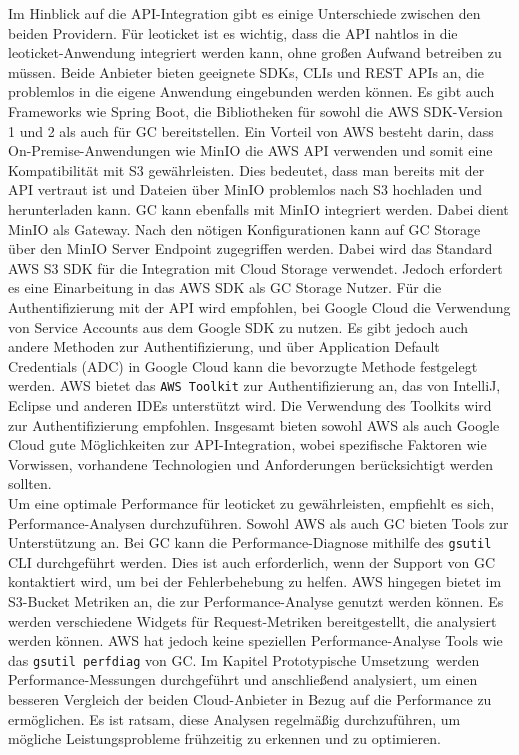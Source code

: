 Im Hinblick auf die API-Integration gibt es einige Unterschiede zwischen den beiden Providern. Für leoticket ist es wichtig, dass die API nahtlos in die leoticket-Anwendung integriert werden kann, ohne großen Aufwand betreiben zu müssen. Beide Anbieter bieten geeignete SDKs, CLIs und REST APIs an, die problemlos in die eigene Anwendung eingebunden werden können. Es gibt auch Frameworks wie Spring Boot, die Bibliotheken für sowohl die AWS SDK-Version 1 und 2 als auch für GC bereitstellen. Ein Vorteil von AWS besteht darin, dass On-Premise-Anwendungen wie MinIO die AWS API verwenden und somit eine Kompatibilität mit S3 gewährleisten. Dies bedeutet, dass man bereits mit der API vertraut ist und Dateien über MinIO problemlos nach S3 hochladen und herunterladen kann. GC kann ebenfalls mit MinIO integriert werden. Dabei dient MinIO als Gateway. Nach den nötigen Konfigurationen kann auf GC Storage über den MinIO Server Endpoint zugegriffen werden. Dabei wird das Standard AWS S3 SDK für die Integration mit Cloud Storage verwendet. Jedoch erfordert es eine Einarbeitung in das AWS SDK als GC Storage Nutzer. Für die Authentifizierung mit der API wird empfohlen, bei Google Cloud die Verwendung von Service Accounts aus dem Google SDK zu nutzen. Es gibt jedoch auch andere Methoden zur Authentifizierung, und über Application Default Credentials (ADC) in Google Cloud kann die bevorzugte Methode festgelegt werden. AWS bietet das \verb|AWS Toolkit| zur Authentifizierung an, das von IntelliJ, Eclipse und anderen IDEs unterstützt wird. Die Verwendung des Toolkits wird zur Authentifizierung empfohlen. Insgesamt bieten sowohl AWS als auch Google Cloud gute Möglichkeiten zur API-Integration, wobei spezifische Faktoren wie Vorwissen, vorhandene Technologien und Anforderungen berücksichtigt werden sollten.\\

Um eine optimale Performance für leoticket zu gewährleisten, empfiehlt es sich, Performance-Analysen durchzuführen. Sowohl AWS als auch GC bieten Tools zur Unterstützung an. Bei GC kann die Performance-Diagnose mithilfe des \verb|gsutil| CLI durchgeführt werden. Dies ist auch erforderlich, wenn der Support von GC kontaktiert wird, um bei der Fehlerbehebung zu helfen. AWS hingegen bietet im S3-Bucket Metriken an, die zur Performance-Analyse genutzt werden können. Es werden verschiedene Widgets für Request-Metriken bereitgestellt, die analysiert werden können. AWS hat jedoch keine speziellen Performance-Analyse Tools wie das \verb|gsutil perfdiag| von GC. Im Kapitel \glqq Prototypische Umsetzung\grqq\ werden Performance-Messungen durchgeführt und anschließend analysiert, um einen besseren Vergleich der beiden Cloud-Anbieter in Bezug auf die Performance zu ermöglichen. Es ist ratsam, diese Analysen regelmäßig durchzuführen, um mögliche Leistungsprobleme frühzeitig zu erkennen und zu optimieren.\\ 

